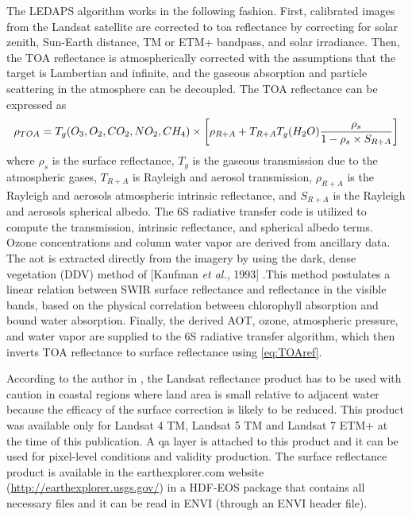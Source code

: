 The LEDAPS algorithm works in the following fashion. First, calibrated images from the Landsat satellite are corrected to \gls{toa} reflectance by correcting for solar zenith, Sun-Earth distance, TM or ETM+ bandpass, and solar irradiance. Then, the TOA reflectance is atmospherically corrected with the assumptions that the target is Lambertian and infinite, and the gaseous absorption and particle scattering in the atmosphere can be decoupled. The TOA reflectance can be expressed as \cite{Masek:2006}
\begin{equation}
	\rho_{TOA}=T_g(O_3,O_2,CO_2,NO_2,CH_4)\\	
		\times \left[\rho_{R+A}+T_{R+A}T_g(H_2O)\frac{\rho_s}{1-\rho_s\times S_{R+A}}\right]
		\label{eq:TOAref} 
\end{equation}
where $\rho_s$ is the surface reflectance, $T_g$ is the gaseous transmission due to the atmospheric gases, $T_{R+A}$ is Rayleigh and aerosol transmission, $\rho_{R+A}$ is the Rayleigh and aerosols atmospheric intrinsic reflectance, and $S_{R+A}$ is the Rayleigh and aerosols spherical albedo. The 6S radiative transfer code is utilized to compute the transmission, intrinsic reflectance, and spherical albedo terms. Ozone concentrations and column water vapor are derived from ancillary data. The \gls{aot} is extracted directly from the imagery by using the dark, dense vegetation (DDV) method of [Kaufman {\it et al.}, 1993] .This method postulates a linear relation between SWIR surface reflectance and reflectance in the visible bands, based on the physical correlation between chlorophyll absorption and bound water absorption. Finally, the derived AOT, ozone, atmospheric pressure, and water vapor are supplied to the 6S radiative transfer algorithm, which then inverts TOA reflectance to surface reflectance using \autoref{eq:TOAref}. 

According to the author in \cite{LandsatCDR}, the Landsat reflectance product has to be used with caution in coastal regions where land area is small relative to adjacent water because the efficacy of the surface correction is likely to be reduced. This product was available only for Landsat 4 TM, Landsat 5 TM and Landsat 7 ETM+ at the time of this publication. A \gls{qa} layer is attached to this product and it can be used for pixel-level conditions and validity production. The surface reflectance product is available in the earthexplorer.com website (\url{http://earthexplorer.usgs.gov/}) in a HDF-EOS package that contains all necessary files and it can be read in ENVI (through an ENVI header file).
